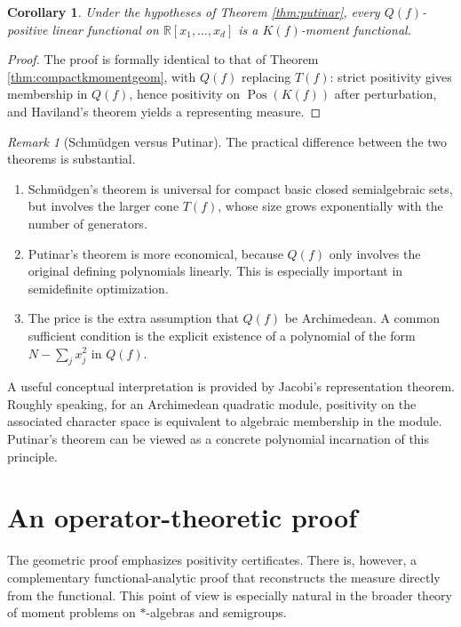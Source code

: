 \documentclass[11pt]{amsart}
\numberwithin{equation}{section}
\newtheorem{corollary}[theorem]{Corollary}
\theoremstyle{definition}
\theoremstyle{remark}
\newtheorem{remark}[theorem]{Remark}
\newcommand{\R}{\mathbb{R}}
\newcommand{\Rxd}{\R[x_1,\dots,x_d]}
\newcommand{\Pos}{\operatorname{Pos}}
\newcommand{\1}{\mathbf{1}}
\begin{document}
\begin{corollary}\label{cor:putinar_moment}
Under the hypotheses of Theorem \ref{thm:putinar}, every \(Q(f)\)-positive linear functional on \(\Rxd\) is a \(K(f)\)-moment functional.
\end{corollary}

\begin{proof}
The proof is formally identical to that of Theorem \ref{thm:compactkmomentgeom}, with \(Q(f)\) replacing \(T(f)\): strict positivity gives membership in \(Q(f)\), hence positivity on \(\Pos(K(f))\) after perturbation, and Haviland's theorem yields a representing measure.
\end{proof}

\begin{remark}[Schm\"udgen versus Putinar]
The practical difference between the two theorems is substantial.
\begin{enumerate}[label=\textup{(\arabic*)}, leftmargin=2em]
\item Schm\"udgen's theorem is universal for compact basic closed semialgebraic sets, but involves the larger cone \(T(f)\), whose size grows exponentially with the number of generators.
\item Putinar's theorem is more economical, because \(Q(f)\) only involves the original defining polynomials linearly. This is especially important in semidefinite optimization.
\item The price is the extra assumption that \(Q(f)\) be Archimedean. A common sufficient condition is the explicit existence of a polynomial of the form \(N-\sum_j x_j^2\) in \(Q(f)\).
\end{enumerate}
\end{remark}

A useful conceptual interpretation is provided by Jacobi's representation theorem. Roughly speaking, for an Archimedean quadratic module, positivity on the associated character space is equivalent to algebraic membership in the module. Putinar's theorem can be viewed as a concrete polynomial incarnation of this principle.

\section{An operator-theoretic proof}\label{sec:operator}

The geometric proof emphasizes positivity certificates. There is, however, a complementary functional-analytic proof that reconstructs the measure directly from the functional. This point of view is especially natural in the broader theory of moment problems on \(*\)-algebras and semigroups.
\end{document}

